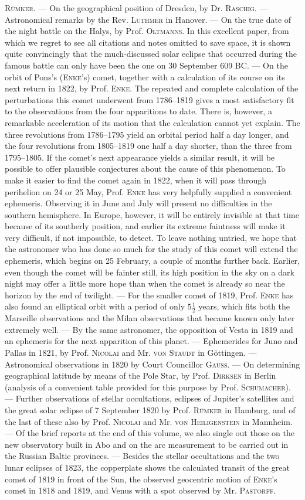 \textsc{Rümker}. --- On the geographical position of Dresden, by Dr. \textsc{Raschig}. --- Astronomical remarks by the Rev. \textsc{Luthmer} in Hanover. --- On the true date of the night battle on the Halys, by Prof. \textsc{Oltmanns}. In this excellent paper, from which we regret to see all citations and notes omitted to save space, it is shown quite convincingly that the much-discussed solar eclipse that occurred during the famous battle can only have been the one on 30 September 609 BC. --- On the orbit of Pons's (\textsc{Enke}'s) comet, together with a calculation of its course on its next return in 1822, by Prof. \textsc{Enke}. The repeated and complete calculation of the perturbations this comet underwent from 1786--1819 gives a most satisfactory fit to the observations from the four apparitions to date. There is, however, a remarkable acceleration of its motion that the calculation cannot yet explain. The three revolutions from 1786--1795 yield an orbital period half a day longer, and the four revolutions from 1805--1819 one half a day shorter, than the three from 1795--1805. If the comet's next appearance yields a similar result, it will be possible to offer plausible conjectures about the cause of this phenomenon. To make it easier to find the comet again in 1822, when it will pass through perihelion on 24 or 25 May, Prof. \textsc{Enke} has very helpfully supplied a convenient ephemeris. Observing it in June and July will present no difficulties in the southern hemisphere. In Europe, however, it will be entirely invisible at that time because of its southerly position, and earlier its extreme faintness will make it very difficult, if not impossible, to detect. To leave nothing untried, we hope that the astronomer who has done so much for the study of this comet will extend the ephemeris, which begins on 25 February, a couple of months further back. Earlier, even though the comet will be fainter still, its high position in the sky on a dark night may offer a little more hope than when the comet is already so near the horizon by the end of twilight. --- For the smaller comet of 1819, Prof. \textsc{Enke} has also found an elliptical orbit with a period of only $5\tfrac{1}{2}$ years, which fits both the Marseille observations and the Milan observations that became known only later extremely well. --- By the same astronomer, the opposition of Vesta in 1819 and an ephemeris for the next apparition of this planet. --- Ephemerides for Juno and Pallas in 1821, by Prof. \textsc{Nicolai} and Mr. \textsc{von Staudt} in Göttingen. --- Astronomical observations in 1820 by Court Councillor \textsc{Gauss}. --- On determining geographical latitude by means of the Pole Star, by Prof. \textsc{Dirksen} in Berlin (analysis of a convenient table provided for this purpose by Prof. \textsc{Schumacher}). --- Further observations of stellar occultations, eclipses of Jupiter's satellites and the great solar eclipse of 7 September 1820 by Prof. \textsc{Rümker} in Hamburg, and of the last of these also by Prof. \textsc{Nicolai} and Mr. \textsc{von Heiligenstein} in Mannheim. --- Of the brief reports at the end of this volume, we also single out those on the new observatory built in Abo and on the arc measurement to be carried out in the Russian Baltic provinces. --- Besides the stellar occultations and the two lunar eclipses of 1823, the copperplate shows the calculated transit of the great comet of 1819 in front of the Sun, the observed geocentric motion of \textsc{Enke}'s comet in 1818 and 1819, and Venus with a spot observed by Mr. \textsc{Pastorff}.
\par\clearpage\endgroup
